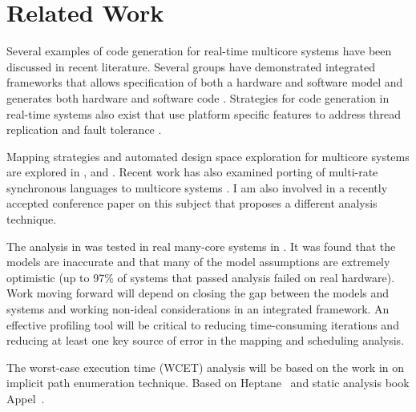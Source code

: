 
\chapter{Related Work} %

\label{c:related} %



Several examples of code generation for real-time multicore systems have been discussed in recent literature. Several groups have demonstrated integrated frameworks that allows specification of both a hardware and software model and generates both hardware and software code \cite{goossens2013compsoc,gauthier2001automatic}. Strategies for code generation in real-time systems also exist that use platform specific features to address thread replication and fault tolerance \cite{huang2012framework}.

Mapping strategies and automated design space exploration for multicore systems are explored in \cite{bolchini2013reliability}, and \cite{kang2014static}. Recent work has also examined porting of multi-rate synchronous languages to multicore systems \cite{puffitsch2013mapping}. I am also involved in a recently accepted conference paper on this subject that proposes a different analysis technique.

The analysis in \cite{kang2014static} was tested in real many-core systems in \cite{sigrist2015mixed}. It was found that the models are inaccurate and that many of the model assumptions are extremely optimistic (up to 97\% of systems that passed analysis failed on real hardware). Work moving forward will depend on closing the gap between the models and systems and working non-ideal considerations in an integrated framework. An effective profiling tool will be critical to reducing time-consuming iterations and reducing at least one key source of error in the mapping and scheduling analysis.

The worst-case execution time (WCET) analysis will be based on the work in \cite{li1995performance} on implicit path enumeration technique. Based on Heptane~\cite{heptane} and static analysis book Appel~\cite{andrew2002modern}. 